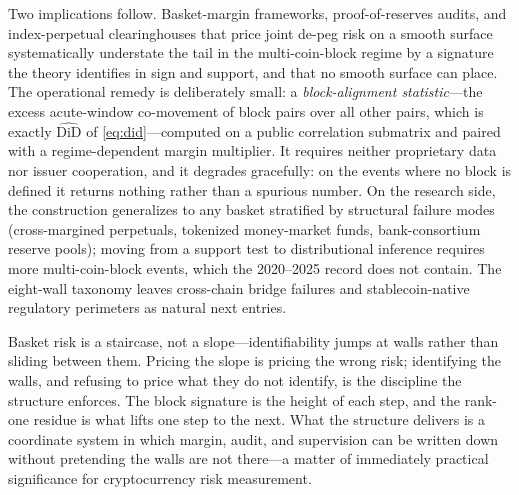 Two implications follow. Basket-margin frameworks, proof-of-reserves audits, and index-perpetual clearinghouses that price joint de-peg risk on a smooth surface systematically understate the tail in the multi-coin-block regime by a signature the theory identifies in sign and support, and that no smooth surface can place. The operational remedy is deliberately small: a \emph{block-alignment statistic}---the excess acute-window co-movement of block pairs over all other pairs, which is exactly $\widehat{\mathrm{DiD}}$ of \eqref{eq:did}---computed on a public correlation submatrix and paired with a regime-dependent margin multiplier. It requires neither proprietary data nor issuer cooperation, and it degrades gracefully: on the events where no block is defined it returns nothing rather than a spurious number. On the research side, the construction generalizes to any basket stratified by structural failure modes (cross-margined perpetuals, tokenized money-market funds, bank-consortium reserve pools); moving from a support test to distributional inference requires more multi-coin-block events, which the 2020--2025 record does not contain. The eight-wall taxonomy leaves cross-chain bridge failures and stablecoin-native regulatory perimeters as natural next entries.

Basket risk is a staircase, not a slope---identifiability jumps at walls rather than sliding between them. Pricing the slope is pricing the wrong risk; identifying the walls, and refusing to price what they do not identify, is the discipline the structure enforces. The block signature is the height of each step, and the rank-one residue is what lifts one step to the next. What the structure delivers is a coordinate system in which margin, audit, and supervision can be written down without pretending the walls are not there---a matter of immediately practical significance for cryptocurrency risk measurement.

\appendix
{}
